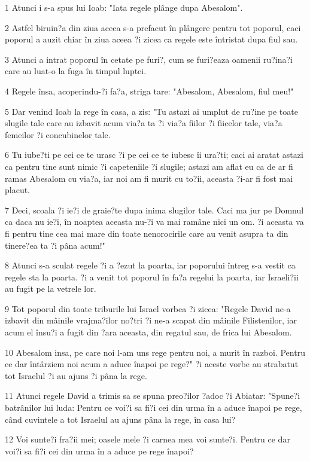 \par 1 Atunci i s-a spus lui Ioab: "Iata regele plânge dupa Abesalom".
\par 2 Astfel biruin?a din ziua aceea s-a prefacut în plângere pentru tot poporul, caci poporul a auzit chiar în ziua aceea ?i zicea ca regele este întristat dupa fiul sau.
\par 3 Atunci a intrat poporul în cetate pe furi?, cum se furi?eaza oamenii ru?ina?i care au luat-o la fuga în timpul luptei.
\par 4 Regele însa, acoperindu-?i fa?a, striga tare: "Abesalom, Abesalom, fiul meu!"
\par 5 Dar venind Ioab la rege în casa, a zis: "Tu astazi ai umplut de ru?ine pe toate slugile tale care au izbavit acum via?a ta ?i via?a fiilor ?i fiicelor tale, via?a femeilor ?i concubinelor tale.
\par 6 Tu iube?ti pe cei ce te urasc ?i pe cei ce te iubesc îi ura?ti; caci ai aratat astazi ca pentru tine sunt nimic ?i capeteniile ?i slugile; astazi am aflat eu ca de ar fi ramas Abesalom cu via?a, iar noi am fi murit cu to?ii, aceasta ?i-ar fi fost mai placut.
\par 7 Deci, scoala ?i ie?i de graie?te dupa inima slugilor tale. Caci ma jur pe Domnul ca daca nu ie?i, în noaptea aceasta nu-?i va mai ramâne nici un om. ?i aceasta va fi pentru tine cea mai mare din toate nenorocirile care au venit asupra ta din tinere?ea ta ?i pâna acum!"
\par 8 Atunci s-a sculat regele ?i a ?ezut la poarta, iar poporului întreg s-a vestit ca regele sta la poarta. ?i a venit tot poporul în fa?a regelui la poarta, iar Israeli?ii au fugit pe la vetrele lor.
\par 9 Tot poporul din toate triburile lui Israel vorbea ?i zicea: "Regele David ne-a izbavit din mâinile vrajma?ilor no?tri ?i ne-a scapat din mâinile Filistenilor, iar acum el însu?i a fugit din ?ara aceasta, din regatul sau, de frica lui Abesalom.
\par 10 Abesalom insa, pe care noi l-am uns rege pentru noi, a murit în razboi. Pentru ce dar întârziem noi acum a aduce înapoi pe rege?" ?i aceste vorbe au strabatut tot Israelul ?i au ajuns ?i pâna la rege.
\par 11 Atunci regele David a trimis sa se spuna preo?ilor ?adoc ?i Abiatar: "Spune?i batrânilor lui luda: Pentru ce voi?i sa fi?i cei din urma în a aduce înapoi pe rege, când cuvintele a tot Israelul au ajuns pâna la rege, în casa lui?
\par 12 Voi sunte?i fra?ii mei; oasele mele ?i carnea mea voi sunte?i. Pentru ce dar voi?i sa fi?i cei din urma în a aduce pe rege înapoi?
